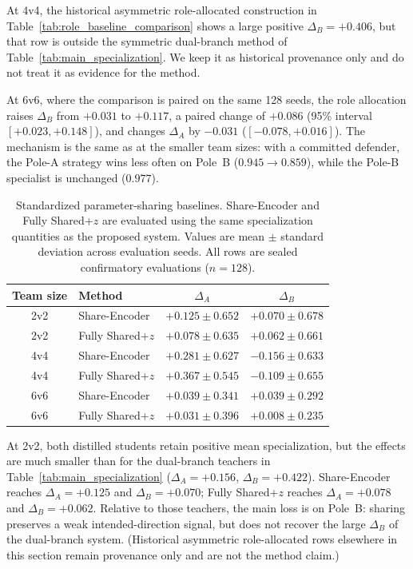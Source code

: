 At 4v4, the historical asymmetric role-allocated construction in
Table~\ref{tab:role_baseline_comparison} shows a large positive
\(\Delta_B=+0.406\), but that row is outside the symmetric dual-branch
method of Table~\ref{tab:main_specialization}. We keep it as historical
provenance only and do not treat it as evidence for the method.

At 6v6, where the comparison is paired on the same 128 seeds, the role
allocation raises $\Delta_B$ from $+0.031$ to $+0.117$, a paired change of
$+0.086$ (95\% interval $[+0.023, +0.148]$), and changes $\Delta_A$ by
$-0.031$ ($[-0.078, +0.016]$). The mechanism is the same as at the smaller
team sizes: with a committed defender, the Pole-A strategy wins less often on
Pole~B ($0.945 \to 0.859$), while the Pole-B specialist is unchanged
($0.977$).

\begin{table}[t]
\centering
\caption{Standardized parameter-sharing baselines. Share-Encoder and Fully
Shared+$z$ are evaluated using the same specialization quantities as the
proposed system. Values are mean $\pm$ standard deviation across evaluation
seeds. All rows are sealed confirmatory evaluations ($n=128$).}
\label{tab:sharing_baselines}
\begin{tabular}{c|l|cc}
\hline
Team size & Method & $\Delta_A$ & $\Delta_B$ \\
\hline
2v2 & Share-Encoder
& $+0.125 \pm 0.652$
& $+0.070 \pm 0.678$ \\ %

2v2 & Fully Shared+$z$
& $+0.078 \pm 0.635$
& $+0.062 \pm 0.661$ \\ %
\hline
4v4 & Share-Encoder
& $+0.281 \pm 0.627$
& $-0.156 \pm 0.633$ \\ %

4v4 & Fully Shared+$z$
& $+0.367 \pm 0.545$
& $-0.109 \pm 0.655$ \\ %
\hline
6v6 & Share-Encoder
& $+0.039 \pm 0.341$
& $+0.039 \pm 0.292$ \\ %

6v6 & Fully Shared+$z$
& $+0.031 \pm 0.396$
& $+0.008 \pm 0.235$ \\ %
\hline
\end{tabular}
\end{table}

At 2v2, both distilled students retain positive mean specialization, but the
effects are much smaller than for the dual-branch teachers in
Table~\ref{tab:main_specialization} ($\Delta_A=+0.156$, $\Delta_B=+0.422$).
Share-Encoder reaches $\Delta_A=+0.125$ and $\Delta_B=+0.070$; Fully Shared+$z$
reaches $\Delta_A=+0.078$ and $\Delta_B=+0.062$. Relative to those teachers,
the main loss is on Pole~B: sharing preserves a weak intended-direction
signal, but does not recover the large $\Delta_B$ of the dual-branch system.
(Historical asymmetric role-allocated rows elsewhere in this section remain
provenance only and are not the method claim.)

